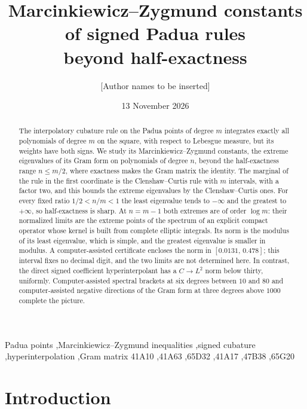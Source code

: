 \documentclass[preprint,12pt,a4paper]{elsarticle}
\date{13 November 2026}
\theoremstyle{remark}
\begin{document}
\begin{frontmatter}
\title{Marcinkiewicz--Zygmund constants of signed Padua rules\texorpdfstring{\\}{ }beyond half-exactness}
\author{[Author names to be inserted]}
\begin{abstract}
The interpolatory cubature rule on the Padua points of degree $m$ integrates
exactly all polynomials of degree $m$ on the square, with respect to Lebesgue
measure, but its weights have both signs. We study its Marcinkiewicz--Zygmund
constants, the extreme eigenvalues of its Gram form on polynomials of degree
$n$, beyond the half-exactness range $n\le m/2$, where exactness makes the Gram
matrix the identity. The marginal of the rule in the first coordinate is the
Clenshaw--Curtis rule with $m$ intervals, with a factor two, and this bounds the
extreme eigenvalues by the Clenshaw--Curtis ones. For every fixed ratio
$1/2<n/m<1$ the least eigenvalue tends to $-\infty$ and the greatest to
$+\infty$, so half-exactness is sharp. At $n=m-1$ both extremes are of order
$\log m$: their normalized limits are the extreme points of the spectrum of an
explicit compact operator whose kernel is built from complete elliptic
integrals. Its norm is the modulus of its least eigenvalue, which is simple, and
the greatest eigenvalue is smaller in modulus. A computer-assisted certificate
encloses the norm in $[0.0131,\,0.478]$; this interval fixes no decimal digit,
and the two limits are not determined here. In contrast, the direct signed
coefficient hyperinterpolant has a $C\to L^2$ norm below thirty, uniformly.
Computer-assisted spectral brackets at six degrees between $10$ and $80$ and
computer-assisted negative directions of the Gram form at three degrees above
$1000$ complete the picture.
\end{abstract}

\begin{keyword}
Padua points \sep Marcinkiewicz--Zygmund inequalities \sep signed cubature \sep hyperinterpolation \sep Gram matrix
\MSC[2020] 41A10 \sep 41A63 \sep 65D32 \sep 41A17 \sep 47B38 \sep 65G20
\end{keyword}
\end{frontmatter}

\section{Introduction}\label{sec:intro}
\end{document}
